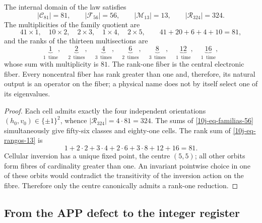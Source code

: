 \begin{theorem}
\label{10j-thm-dominio}
The internal domain of the law satisfies
\begin{equation}
 |\mathcal C_{81}|=81,
 \qquad |\mathcal F_{56}|=56,
 \qquad |\mathcal M_{13}|=13,
 \qquad |\mathcal R_{324}|=324.
 \label{10j-eq-censo-dominio}
\end{equation}
The multiplicities of the family quotient are
\begin{equation}
 41\times1,\quad10\times2,\quad2\times3,\quad1\times4,\quad2\times5,
 \qquad 41+20+6+4+10=81,
 \label{10j-eq-familias-56}
\end{equation}
and the ranks of the thirteen multisections are
\begin{equation}
 \underbrace{1}_{1\ \text{ time}},\quad
 \underbrace{2}_{2\ \text{ times}},\quad
 \underbrace{4}_{3\ \text{ times}},\quad
 \underbrace{6}_{2\ \text{ times}},\quad
 \underbrace{8}_{3\ \text{ times}},\quad
 \underbrace{12}_{1\ \text{ time}},\quad
 \underbrace{16}_{1\ \text{ time}},
 \label{10j-eq-rangos-13}
\end{equation}
whose sum with multiplicity is \(81\). The rank-one fiber is the central
electronic fiber. Every noncentral fiber has rank greater than one and,
therefore, its natural output is an operator on the fiber; a physical name does not
by itself select one of its eigenvalues.
\end{theorem}

\begin{proof}
Each cell admits exactly the four independent orientations
\((h_0,v_0)\in\{\pm1\}^2\), whence
\(|\mathcal R_{324}|=4\cdot81=324\). The sums of
\eqref{10j-eq-familias-56} simultaneously give fifty-six classes and
eighty-one cells. The rank sum of \eqref{10j-eq-rangos-13} is
\[
 1+2\cdot2+3\cdot4+2\cdot6+3\cdot8+12+16=81.
\]
Cellular inversion has a unique fixed point, the centre \((5,5)\); all other orbits form fibres of cardinality greater than one. An invariant pointwise choice in one of these orbits would contradict the transitivity of the inversion action on the fibre. Therefore only the centre canonically admits a rank-one reduction.
\end{proof}

\subsection{From the APP defect to the integer register}

